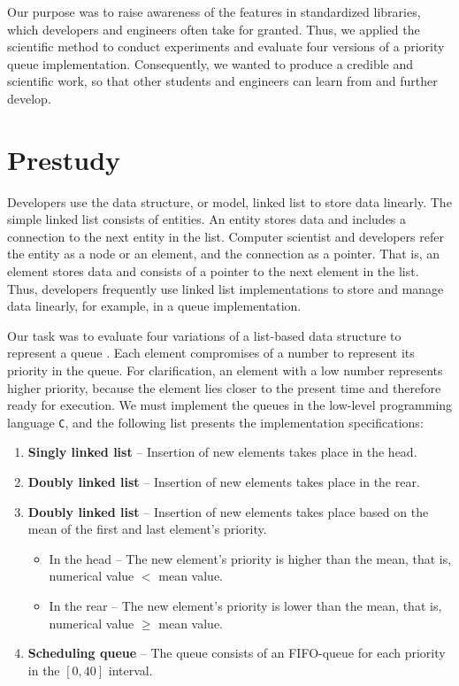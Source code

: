 \documentclass[a4paper,11pt]{kth-mag}
\newcommand*{\skippara}{\par\vspace{\baselineskip} \noindent}
\begin{document}
\skippara Our purpose was to raise awareness of the features in standardized libraries, which developers and engineers often take for granted.
Thus, we applied the scientific method to conduct experiments and evaluate four versions of a priority queue implementation.
Consequently, we wanted to produce a credible and scientific work, so that other students and engineers can learn from and further develop.

\section{Prestudy}\label{sec:prestudy}
Developers use the data structure, or model, linked list to store data linearly.
The simple linked list consists of entities.
An entity stores data and includes a connection to the next entity in the list.
Computer scientist and developers refer the entity as a node or an element, and the connection as a pointer.
That is, an element stores data and consists of a pointer to the next element in the list.
Thus, developers frequently use linked list implementations to store and manage data linearly, for example, in a queue implementation.

\skippara Our task was to evaluate four variations of a list-based data structure to represent a queue \cite{Uppgiftl9:online}.
Each element compromises of a number to represent its priority in the queue.
For clarification, an element with a low number represents higher priority, because the element lies closer to the present time and therefore ready for execution.
We must implement the queues in the low-level programming language \texttt{C}, and the following list presents the implementation specifications:
\begin{enumerate}
    \item \textbf{Singly linked list} -- Insertion of new elements takes place in the head.
    \item \textbf{Doubly linked list} -- Insertion of new elements takes place in the rear.
        \item \textbf{Doubly linked list} -- Insertion of new elements takes place based on the mean of the first and last element's priority.
        \begin{itemize}
            \item In the head -- The new element's priority is higher than the mean, that is, \\numerical value $<$ mean value.
            \item In the rear -- The new element's priority is lower than the mean, that is,\\numerical value $\ge$ mean value.
        \end{itemize}
    \item \textbf{Scheduling queue} -- The queue consists of an FIFO-queue for each priority in the $[0,40]$ interval.
\end{enumerate}
\end{document}
